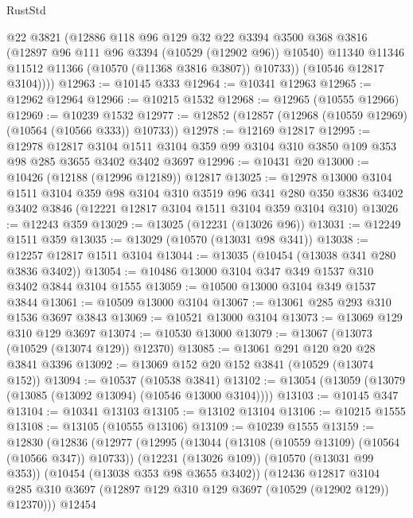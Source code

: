 \begin{lexlean}{RustStd}
\begin{coremodule}
            @22
            @3821
            (@12886
              @118
              @96
              @129
              @32
              @22
              @3394
              @3500
              @368
              @3816
              (@12897 @96 @111 @96 @3394 (@10529 (@12902 @96)) @10540)
              @11340
              @11346
              @11512
              @11366
              (@10570 (@11368 @3816 @3807))
              @10733))
          (@10546 @12817 @3104))))
@12963 := @10145 @333
@12964 := @10341 @12963
@12965 := @12962 @12964
@12966 := @10215 @1532
@12968 := @12965 (@10555 @12966)
@12969 := @10239 @1532
@12977 := @12852 (@12857 (@12968 (@10559 @12969) (@10564 (@10566 @333)) @10733))
@12978 := @12169 @12817
@12995 := @12978
    @12817
    @3104
    @1511
    @3104
    @359
    @99
    @3104
    @310
    @3850
    @109
    @353
    @98
    @285
    @3655
    @3402
    @3402
    @3697
@12996 := @10431 @20
@13000 := @10426 (@12188 (@12996 @12189)) @12817
@13025 := @12978
    @13000
    @3104
    @1511
    @3104
    @359
    @98
    @3104
    @310
    @3519
    @96
    @341
    @280
    @350
    @3836
    @3402
    @3402
    @3846
    (@12221 @12817 @3104 @1511 @3104 @359 @3104 @310)
@13026 := @12243 @359
@13029 := @13025 (@12231 (@13026 @96))
@13031 := @12249 @1511 @359
@13035 := @13029 (@10570 (@13031 @98 @341))
@13038 := @12257 @12817 @1511 @3104
@13044 := @13035 (@10454 (@13038 @341 @280 @3836 @3402))
@13054 := @10486 @13000 @3104 @347 @349 @1537 @310 @3402 @3844 @3104 @1555
@13059 := @10500 @13000 @3104 @349 @1537 @3844
@13061 := @10509 @13000 @3104
@13067 := @13061 @285 @293 @310 @1536 @3697 @3843
@13069 := @10521 @13000 @3104
@13073 := @13069 @129 @310 @129 @3697
@13074 := @10530 @13000
@13079 := @13067 (@13073 (@10529 (@13074 @129)) @12370)
@13085 := @13061 @291 @120 @20 @28 @3841 @3396
@13092 := @13069 @152 @20 @152 @3841 (@10529 (@13074 @152))
@13094 := @10537 (@10538 @3841)
@13102 := @13054 (@13059 (@13079 (@13085 (@13092 @13094) (@10546 @13000 @3104))))
@13103 := @10145 @347
@13104 := @10341 @13103
@13105 := @13102 @13104
@13106 := @10215 @1555
@13108 := @13105 (@10555 @13106)
@13109 := @10239 @1555
@13159 := @12830
    (@12836
      (@12977
        (@12995
          (@13044 (@13108 (@10559 @13109) (@10564 (@10566 @347)) @10733))
          (@12231 (@13026 @109))
          (@10570 (@13031 @99 @353))
          (@10454 (@13038 @353 @98 @3655 @3402))
          (@12436
            @12817
            @3104
            @285
            @310
            @3697
            (@12897 @129 @310 @129 @3697 (@10529 (@12902 @129)) @12370)))
        @12454

\end{coremodule}
\end{lexlean}
